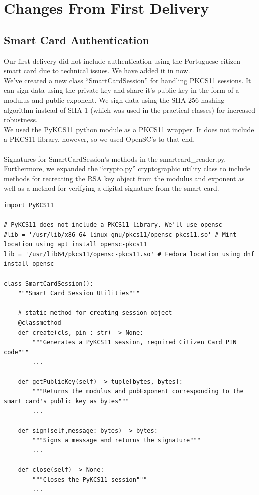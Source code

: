 \documentclass[11pt]{article}
\begin{document}
\section{Changes From First Delivery}\label{changes}
\subsection{Smart Card Authentication}\label{smart card authentication}
Our first delivery did not include authentication using the Portuguese citizen smart card due to technical issues. We have added it in now.\\
We’ve created a new class “SmartCardSession” for handling PKCS11 sessions. It can sign data using the private key and share it’s public key in the form of a modulus and public exponent. We sign data using the SHA-256 hashing algorithm instead of SHA-1 (which was used in the practical classes) for increased robustness.\\
We used the PyKCS11 python module as a PKCS11 wrapper. It does not include a PKCS11 library, however, so we used OpenSC’s to that end.\\ 
\\
Signatures for SmartCardSession's methods in the smartcard\_reader.py.\\ 
Furthermore, we expanded the “crypto.py” cryptographic utility class to include methods for recreating  the RSA key object from the modulus and exponent as well as a method for verifying a digital signature from the smart card.

\begin{lstlisting}[captionpos=b label=listing:sparql_getallindividuals,
   basicstyle=\ttfamily]
import PyKCS11

# PyKCS11 does not include a PKCS11 library. We'll use opensc
#lib = '/usr/lib/x86_64-linux-gnu/pkcs11/opensc-pkcs11.so' # Mint location using apt install opensc-pkcs11
lib = '/usr/lib64/pkcs11/opensc-pkcs11.so' # Fedora location using dnf install opensc

class SmartCardSession():
    """Smart Card Session Utilities"""

    # static method for creating session object
    @classmethod
    def create(cls, pin : str) -> None:
        """Generates a PyKCS11 session, required Citizen Card PIN code"""
		...
		
    def getPublicKey(self) -> tuple[bytes, bytes]:
        """Returns the modulus and pubExponent corresponding to the smart card's public key as bytes"""
        ...

    def sign(self,message: bytes) -> bytes:
        """Signs a message and returns the signature"""
		...

    def close(self) -> None:
        """Closes the PyKCS11 session"""
        ...
        
\end{lstlisting}
\end{document}
